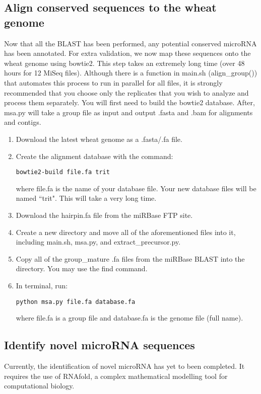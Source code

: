 \documentclass[12pt,titlepage]{article}
\begin{document}
\subsection{Align conserved sequences to the wheat genome}
Now that all the BLAST has been performed, any potential conserved microRNA has been annotated. For extra validation, we now map these sequences onto the wheat genome using bowtie2. This step takes an extremely long time (over 48 hours for 12 MiSeq files). Although there is a function in main.sh (align\_group()) that automates this process to run in parallel for all files, it is strongly recommended that you choose only the replicates that you wish to analyze and process them separately. You will first need to build the bowtie2 database. After, msa.py will take a group file as input and output .fasta and .bam for alignments and contigs.
\begin{enumerate}
\item Download the latest wheat genome as a .fasta/.fa file.
\item Create the alignment database with the command:
\begin{tcolorbox}
\begin{lstlisting}
bowtie2-build file.fa trit 
\end{lstlisting}
\end{tcolorbox}where file.fa is the name of your database file. Your new database files will be named ``trit". This will take a very long time.
\item Download the hairpin.fa file from the miRBase FTP site.
\item Create a new directory and move all of the aforementioned files into it, including main.sh, msa.py, and extract\_precursor.py.
\item Copy all of the group\_mature .fa files from the miRBase BLAST into the directory. You may use the find command.
\item In terminal, run:
\begin{tcolorbox}
\begin{lstlisting}
python msa.py file.fa database.fa
\end{lstlisting}
\end{tcolorbox}where file.fa is a group file and database.fa is the genome file (full name).
\end{enumerate}

\subsection{Identify novel microRNA sequences}
Currently, the identification of novel microRNA has yet to been completed. It requires the use of RNAfold, a complex mathematical modelling tool for computational biology.\\ 
\end{document}

